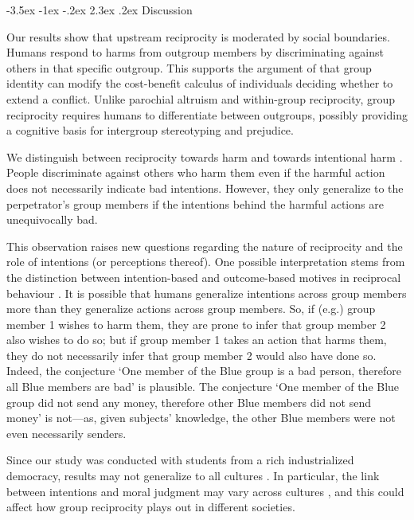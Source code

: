 \documentclass[12pt,a4paper]{article}\usepackage[]{graphicx}\usepackage[]{color}
\makeatletter
\renewcommand\section{\@startsection {section}{1}{\z@}%
{-3.5ex \@plus -1ex \@minus -.2ex}%
{2.3ex \@plus.2ex}%
{\bf\sffamily\Large}}
\makeatother
\begin{document}
\section{Discussion}
\label{sec:conclusion}

Our results show that upstream reciprocity is moderated by social boundaries. 
Humans respond to harms from outgroup members by discriminating against others 
in that specific outgroup. This supports the argument of \cite{Pietraszewski2016470} that group identity can modify the cost-benefit calculus of individuals deciding whether to extend a conflict. Unlike parochial altruism and within-group reciprocity, group reciprocity requires humans to differentiate between outgroups, possibly providing a cognitive basis for intergroup stereotyping and prejudice.

We distinguish between reciprocity towards harm and towards intentional harm
\citep{stanca2009testing}. People discriminate against others who harm them even
if the harmful action does not necessarily indicate bad intentions. However,
they only generalize to the perpetrator's  group members if the intentions
behind the harmful actions are unequivocally bad.

This observation raises new questions regarding the nature of reciprocity
and the role of intentions (or perceptions thereof). One possible
interpretation stems from the distinction between intention-based
and outcome-based motives in reciprocal behaviour \citep{falk2006theory}. It is
possible that humans generalize intentions across group members more than they generalize
actions across group members. So, if (e.g.)  group member 1 wishes to harm them,  they are prone to infer
that group member 2 also wishes to do so; but if group member 1 takes an action
that harms them, they do not necessarily infer that group member 2 would also
have done so. Indeed, the conjecture `One member of the Blue
group is a bad person, therefore all Blue members are bad' is plausible.
The conjecture `One member of the Blue group did not send any money,
therefore other Blue members did not send money' is not---as, given subjects' knowledge, the other
Blue members were not even necessarily senders.

Since our study was conducted with students from a rich industrialized democracy, results may not
generalize to all cultures \citep{henrich2010most}. In particular, the link between intentions
and moral judgment may vary across cultures \citep{barrett2016small}, and this could affect how group 
reciprocity plays out in different societies.
\end{document}
